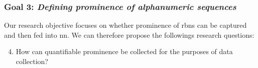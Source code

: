 \subsubsection*{Goal 3: \itshape Defining prominence of alphanumeric sequences}

Our research objective focuses on whether prominence of \glspl{rbn} can be captured and then fed into \gls{nn}.
We can therefore propose the followings research questions:
\begin{enumerate}[label=\bfseries~RQ\arabic*), leftmargin=2cm, rightmargin=1.5cm]
  \setcounter{enumi}{3}
  \item\label{rq:5} How can quantifiable prominence be collected for the purposes of data collection?
\end{enumerate}

